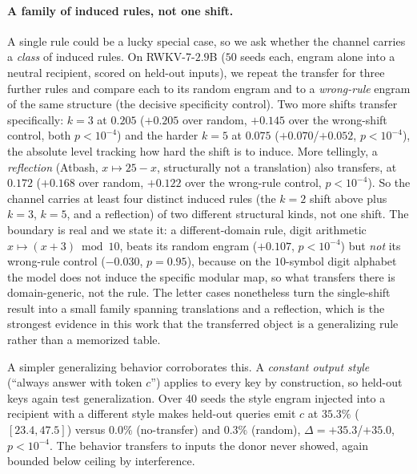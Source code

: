 \documentclass[11pt]{article}
\theoremstyle{definition}
\begin{document}
\paragraph{A family of induced rules, not one shift.}
A single rule could be a lucky special case, so we ask whether the channel carries a \emph{class} of induced rules. On RWKV-7-$2.9$B ($50$ seeds each, engram alone into a neutral recipient, scored on held-out inputs), we repeat the transfer for three further rules and compare each to its random engram and to a \emph{wrong-rule} engram of the same structure (the decisive specificity control). Two more shifts transfer specifically: $k{=}3$ at $0.205$ ($+0.205$ over random, $+0.145$ over the wrong-shift control, both $p<10^{-4}$) and the harder $k{=}5$ at $0.075$ ($+0.070$/$+0.052$, $p<10^{-4}$), the absolute level tracking how hard the shift is to induce. More tellingly, a \emph{reflection} (Atbash, $x\mapsto 25{-}x$, structurally not a translation) also transfers, at $0.172$ ($+0.168$ over random, $+0.122$ over the wrong-rule control, $p<10^{-4}$). So the channel carries at least four distinct induced rules (the $k{=}2$ shift above plus $k{=}3$, $k{=}5$, and a reflection) of two different structural kinds, not one shift. The boundary is real and we state it: a different-domain rule, digit arithmetic $x\mapsto(x{+}3)\bmod 10$, beats its random engram ($+0.107$, $p<10^{-4}$) but \emph{not} its wrong-rule control ($-0.030$, $p=0.95$), because on the $10$-symbol digit alphabet the model does not induce the specific modular map, so what transfers there is domain-generic, not the rule. The letter cases nonetheless turn the single-shift result into a small family spanning translations and a reflection, which is the strongest evidence in this work that the transferred object is a generalizing rule rather than a memorized table.

A simpler generalizing behavior corroborates this. A \emph{constant output style} (``always answer with token $c$'') applies to every key by construction, so held-out keys again test generalization. Over $40$ seeds the style engram injected into a recipient with a different style makes held-out queries emit $c$ at $35.3\%$ ($[23.4,47.5]$) versus $0.0\%$ (no-transfer) and $0.3\%$ (random), $\Delta=+35.3$/$+35.0$, $p<10^{-4}$. The behavior transfers to inputs the donor never showed, again bounded below ceiling by interference.
\end{document}
